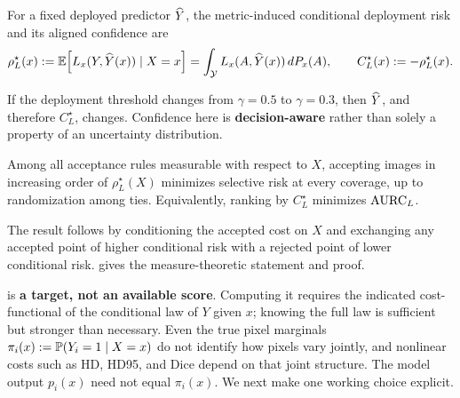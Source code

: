 \begin{definition}
\label{def:ideal}
For a fixed deployed predictor \(\widehat{Y}\), the metric-induced conditional
deployment risk and its aligned confidence are
\begin{equation*}
  \rho_L^\star(x)
  :=\mathbb{E}\!\left[L_x(Y,\widehat{Y}(x))\mid X=x\right]
  =\int_{\mathcal Y}L_x(A,\widehat{Y}(x))\,dP_x(A),
  \qquad
  C_L^\star(x):=-\rho_L^\star(x).
\end{equation*}
\end{definition}
If the deployment threshold changes from \(\gamma=0.5\) to \(\gamma=0.3\),
then \(\widehat{Y}\), and therefore \(C_L^\star\), changes. Confidence here is
\textbf{decision-aware} rather than solely a property of an uncertainty distribution.

\begin{proposition}
\label{prop:ideal-ranking}
Among all acceptance rules measurable with respect to \(X\), accepting images in
increasing order of \(\rho_L^\star(X)\) minimizes selective risk at every coverage,
up to randomization among ties. Equivalently, ranking by \(C_L^\star\) minimizes
\(\operatorname{AURC}_L\).
\end{proposition}
The result follows by conditioning the accepted cost on \(X\) and exchanging any
accepted point of higher conditional risk with a rejected point of lower conditional
risk.  gives the measure-theoretic statement and proof.

 is \textbf{a target, not an available score}. Computing it
requires the indicated cost-functional of the conditional law of \(Y\) given
\(x\); knowing the full law is sufficient but stronger than necessary. Even the
true pixel marginals \(\pi_i(x):=\mathbb{P}(Y_i=1\mid X=x)\) do not identify how pixels
vary jointly, and nonlinear costs such as HD, HD95, and Dice depend on that joint
structure. The model output \(p_i(x)\) need not equal \(\pi_i(x)\). We next make
one working choice explicit.
